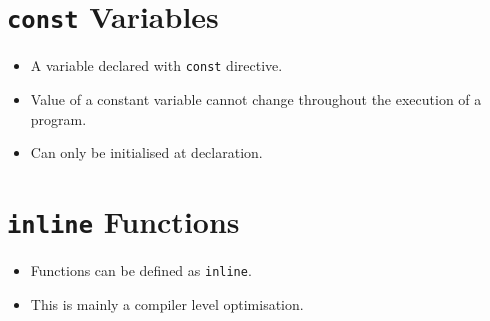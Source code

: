 \documentclass[12pt,a4paper]{article}
\begin{document}
\section{\texttt{const} Variables}
\begin{itemize}
\item A variable declared with \verb|const| directive.
\item Value of a constant variable cannot change throughout the execution of a program.
\item Can only be initialised at declaration.
\end{itemize}
\section{\texttt{inline} Functions}
\begin{itemize}
\item Functions can be defined as \verb|inline|.
\item This is mainly a compiler level optimisation.
\end{itemize}
\end{document}
